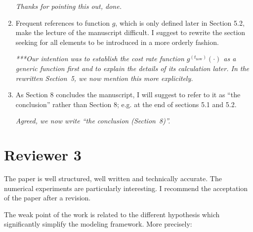 \documentclass[authoryear]{elsarticle}
\def\tnow{t_\text{now}}
\begin{document}
\begin{enumerate}
\smallskip

\emph{Thanks for pointing this out, done.}

\item Frequent references to function $g$, which is only defined later in Section 5.2, make the lecture of the manuscript difficult. I suggest to rewrite the section seeking for all elements to be introduced in a more orderly fashion.

\smallskip

\emph{***Our intention was to establish the cost rate function $g^{(\tnow)}(\cdot)$ as a generic function first
and to explain the details of its calculation later.
In the rewritten Section~5, we now mention this more explicitely.}

\item As Section 8 concludes the manuscript, I will suggest to refer to it as “the conclusion” rather than Section 8; e.g. at the end of sections 5.1 and 5.2.

\smallskip

\emph{Agreed, we now write ``the conclusion (Section~8)''.}
\end{enumerate}


\section*{Reviewer 3}

The paper is well structured, well written and technically accurate. The numerical experiments are particularly interesting. I recommend the acceptation of the paper after a revision. 

The weak point of the work is related to the different hypothesis which significantly simplify the modeling framework. More precisely:
\end{document}
